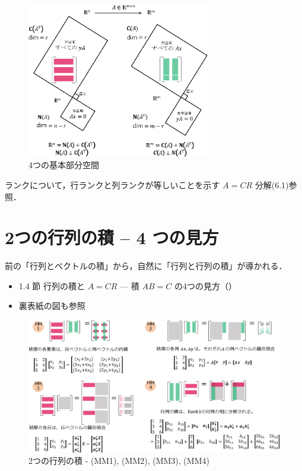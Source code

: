 \documentclass[letterpaper]{article}
\begin{document}
\begin{figure}[H]
  \centering
  \includegraphics[keepaspectratio, width=8cm]{4-Subspaces-j.eps}
  \caption{4つの基本部分空間}
\end{figure}

ランクについて，行ランクと列ランクが等しいことを示す $A=CR$ 分解(6.1)参照．
\clearpage

\section{2つの行列の積 -- 4 つの見方}

前の「行列とベクトルの積」から，自然に「行列と行列の積」が導かれる．

\begin{itemize}
  \item 1.4 節 行列の積と $A=CR$ \; --- 積 $AB=C$ の4つの見方（）
  \item 裏表紙の図も参照
\end{itemize} 


\begin{figure}[H]
  \includegraphics[keepaspectratio, width=\linewidth]{MatrixTimesMatrix-j.eps}
  \caption{2つの行列の積 - (MM1), (MM2), (MM3), (MM4)}
\end{figure}
\end{document}
